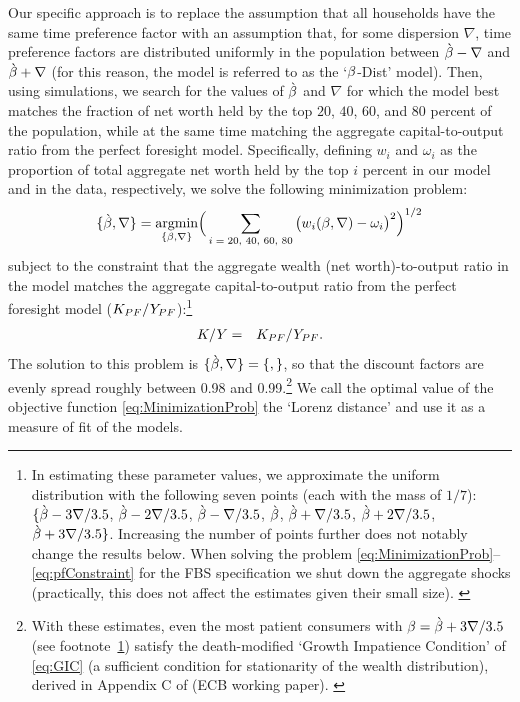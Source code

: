 \documentclass[12pt,titlepage]{econtex}
\begin{document}
Our specific approach is to replace the assumption that all households have the same time
preference factor with an assumption that, for some dispersion $\nabla$, time
preference factors are distributed uniformly in the population between
$\grave{\Discount}-\nabla$ and $\grave{\Discount}+\nabla$ (for this reason, the model is referred to as the `$\Discount$-Dist' model).  Then,
using simulations, we search for the values of $\grave{\Discount}$ and
$\nabla$ for which the model best matches the fraction of net worth held by the top $20$, $40$, $60$, and $80$ percent of the population, while at the same time matching
the aggregate capital-to-output ratio from the perfect foresight
model. Specifically, defining $w_{i}$ and $\omega _{i}$ as the proportion of total aggregate net worth held by the top $i$ percent in our model and in the data, respectively, we solve the following minimization problem:
\begin{equation}
  \{\grave{\beta}, \nabla\}= \underset{\{{\beta}, \nabla\}}{\text{argmin} }\Big(\sum_\text{$i=20$, $40$, $60$, $80$}
  \big(w_{i}({\beta}, \nabla)-\omega _{i}\big)^{2}\Big)^{1/2} \label{eq:MinimizationProb}
\end{equation}
subject to the constraint that the aggregate wealth (net worth)-to-output ratio in the model matches the aggregate
capital-to-output ratio from the perfect foresight model ($\KLev_{PF}/\YLev_{PF}$):\footnote{In estimating these parameter values, we approximate the uniform distribution with the following seven points (each with the mass of $1/7$): $\{\grave{\Discount}-3\nabla/3.5$, $\grave{\Discount}-2\nabla/3.5$, $\grave{\Discount}-\nabla/3.5$, $\grave{\Discount}$, $\grave{\Discount}+\nabla/3.5$, $\grave{\Discount}+2\nabla/3.5$, $\grave{\Discount}+3\nabla/3.5\}$. Increasing the number of points further does not notably change the results below. When solving the problem \eqref{eq:MinimizationProb}--\eqref{eq:pfConstraint} for the FBS specification we shut down the aggregate shocks (practically, this does not affect the estimates given their small size).
  \label{foot:uniApprox}}
\begin{eqnarray}
  K/Y & = & K_{PF}/Y_{PF}.  \label{eq:pfConstraint}
\end{eqnarray}
The solution to this problem is $\{\grave{\Discount}, \nabla\}=\{

,

\}$, so that the discount factors are evenly spread roughly between 0.98 and 0.99.\footnote{With these estimates, even the most patient consumers with $\Discount=\grave{\Discount}+3\nabla/3.5$ (see footnote~\ref{foot:uniApprox}) satisfy the death-modified `Growth Impatience Condition' of \eqref{eq:GIC} (a sufficient condition for stationarity of the wealth distribution), derived in Appendix C of \citet{cstKS} (ECB working paper). \label{foot:DMGIC} } We call the optimal value of the objective function \eqref{eq:MinimizationProb} the `Lorenz distance' and use it as a measure of fit of the models.
\end{document}
